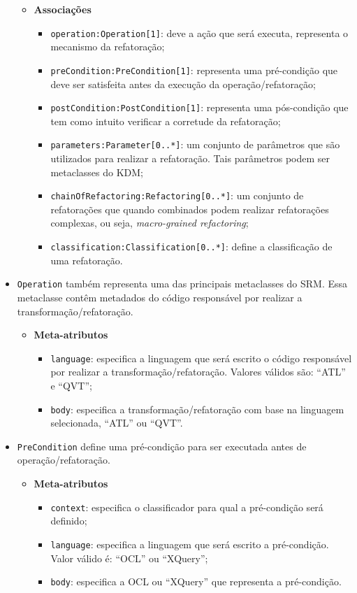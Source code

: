 \begin{itemize}
\begin{itemize}
	\item \textbf{Associações}
		\begin{itemize}
			\item \texttt{operation:Operation[1]}: deve a ação que será executa, representa o mecanismo da refatoração;
			\item \texttt{preCondition:PreCondition[1]}: representa uma pré-condição que deve ser satisfeita antes da execução da operação/refatoração;
			\item \texttt{postCondition:PostCondition[1]}: representa uma pós-condição que tem como intuito verificar a corretude da refatoração;
			\item \texttt{parameters:Parameter[0..*]}: um conjunto de parâmetros que são utilizados para realizar a refatoração. Tais parâmetros podem ser metaclasses do KDM;
			\item \texttt{chainOfRefactoring:Refactoring[0..*]}: um conjunto de refatorações que quando combinados podem realizar refatorações complexas, ou seja, \textit{macro-grained refactoring};
			\item \texttt{classification:Classification[0..*]}: define a classificação de uma refatoração.
		\end{itemize}	
\end{itemize} 

\item \texttt{Operation} também representa uma das principais metaclasses do SRM. Essa metaclasse contêm metadados do código responsável por realizar a transformação/refatoração.

\begin{itemize}
	\item \textbf{Meta-atributos}
		\begin{itemize}
			\item \texttt{language}: especifica a linguagem que será escrito o código responsável por realizar a transformação/refatoração. Valores válidos são: ``ATL'' e ``QVT'';
			\item \texttt{body}: especifica a transformação/refatoração com base na linguagem selecionada, ``ATL'' ou ``QVT''.
		\end{itemize}	
\end{itemize} 

\item \texttt{PreCondition} define uma pré-condição para ser executada antes de operação/refatoração.

\begin{itemize}
	\item \textbf{Meta-atributos}
		\begin{itemize}
			\item \texttt{context}: especifica o classificador para qual a pré-condição será definido;
			\item \texttt{language}: especifica a linguagem que será escrito a pré-condição. Valor válido é: ``OCL'' ou ``XQuery'';
			\item \texttt{body}: especifica a OCL ou ``XQuery'' que representa a pré-condição.
		\end{itemize}	
\end{itemize} 


\end{itemize}
